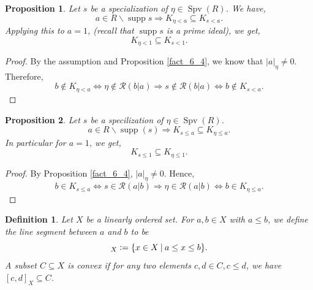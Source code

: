\documentclass[8pt]{article}
\numberwithin{equation}{section}
\newtheorem{proposition}{Proposition}[subsection]
\newtheorem{definition}{Definition}[subsection]
\DeclareMathOperator{\supp}{supp}
\DeclareMathOperator{\Spv}{Spv}
\newcommand{\defeq}{\vcentcolon=}
\newcommand{\cR}[0]{\mathcal{R}}
\newcommand{\sep}[0]{\:|\:}
\newcommand{\ab}[1]{\vert #1 \vert}
\begin{document}
\begin{proposition}
    \label{fact_6_6}
    Let $s$ be a specialization of $\eta\in\Spv(R)$. We have,
    \begin{equation*}
        a\in R\backslash\supp s\Rightarrow K_{\eta<a}\subseteq K_{s<a}.
    \end{equation*}
    Applying this to $a=1$, (recall that $\supp s$ is a prime ideal), we get,
    \begin{equation*}
        K_{\eta<1}\subseteq K_{s<1}.
    \end{equation*}
\end{proposition}

\begin{proof}
    By the assumption and Proposition \ref{fact_6_4}, we know that $\ab{a}_\eta\not=0$. Therefore,
    \begin{equation*}
        b\not\in K_{\eta<a}\iff\eta\not\in\cR(b|a)\Rightarrow s\not\in \cR(b|a)\iff b\not\in K_{s<a}.
    \end{equation*}
\end{proof}
\begin{proposition}
    \label{fact_6_7}
    Let $s$ be a specilization of $\eta\in\Spv(R)$. 
    \begin{equation*}
        a\in R\backslash\supp(s)\Rightarrow K_{s\leq a}\subseteq K_{\eta\leq a}.
    \end{equation*}
    In particular for $a=1$, we get,
    \begin{equation*}
        K_{s\leq 1}\subseteq K_{\eta\leq 1}.
    \end{equation*}
\end{proposition}

\begin{proof}
    By Proposition \ref{fact_6_4}, $\ab{a}_\eta\not=0$. Hence,
    \begin{equation*}
        b\in K_{s\leq a}\iff s\in \cR(a|b)\Rightarrow \eta\in\cR(a|b)\iff b\in K_{\eta\leq a}.
    \end{equation*}
\end{proof}
\begin{definition}
    \label{definition_6_8}
    Let $X$ be a linearly ordered set. For $a,b\in X$ with $a\leq b$, we define the line segment between $a$ and $b$ to be 
    \begin{equation*}
        [a,b]_X \defeq\{x\in X\sep a\leq x\leq b\}.
    \end{equation*}
    A subset $C\subseteq X$ is convex if for any two elements $c,d\in C,c\leq d$, we have $[ c,d]_X\subseteq C$.
\end{definition}
\end{document}
